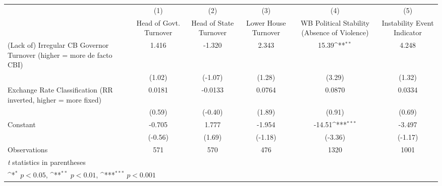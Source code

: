 {
\def\sym#1{\ifmmode^{#1}\else\(^{#1}\)\fi}
\begin{tabular*}{\linewidth}{@{\hskip\tabcolsep\extracolsep\fill}l*{5}{c}}
\toprule
                &\multicolumn{1}{c}{(1)}&\multicolumn{1}{c}{(2)}&\multicolumn{1}{c}{(3)}&\multicolumn{1}{c}{(4)}&\multicolumn{1}{c}{(5)}\\
                &\multicolumn{1}{c}{Head of Govt. Turnover}&\multicolumn{1}{c}{Head of State Turnover}&\multicolumn{1}{c}{Lower House Turnover}&\multicolumn{1}{c}{WB Political Stability (Absence of Violence)}&\multicolumn{1}{c}{Instability Event Indicator}\\
\midrule
(Lack of) Irregular CB Governor Turnover (higher = more de facto CBI)&    1.416         &   -1.320         &    2.343         &    15.39\sym{**} &    4.248         \\
                &   (1.02)         &  (-1.07)         &   (1.28)         &   (3.29)         &   (1.32)         \\
\addlinespace
Exchange Rate Classification (RR inverted, higher = more fixed)&   0.0181         &  -0.0133         &   0.0764         &   0.0870         &   0.0334         \\
                &   (0.59)         &  (-0.40)         &   (1.89)         &   (0.91)         &   (0.69)         \\
\addlinespace
Constant        &   -0.705         &    1.777         &   -1.954         &   -14.51\sym{***}&   -3.497         \\
                &  (-0.56)         &   (1.69)         &  (-1.18)         &  (-3.36)         &  (-1.17)         \\
\midrule
Observations    &      571         &      570         &      476         &     1320         &     1001         \\
\bottomrule
\multicolumn{6}{l}{\footnotesize \textit{t} statistics in parentheses}\\
\multicolumn{6}{l}{\footnotesize \sym{*} \(p<0.05\), \sym{**} \(p<0.01\), \sym{***} \(p<0.001\)}\\
\end{tabular*}
}
